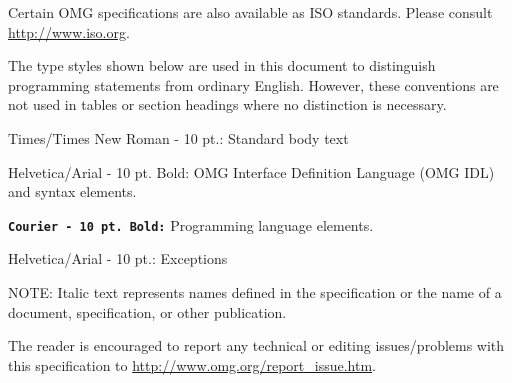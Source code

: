 \documentclass[10pt, a4paper, wd]{isov2}
\begin{document}
\noindent Certain OMG specifications are also available as ISO standards. Please consult \url{http://www.iso.org}.



The type styles shown below are used in this document to distinguish
 programming statements from ordinary English. However, these conventions are
 not used in tables or section headings where no distinction is necessary.



\medskip \noindent
Times/Times New Roman - 10 pt.:  Standard body text


\medskip \noindent
{\selectfont
Helvetica/Arial - 10 pt. Bold: } OMG Interface Definition Language (OMG IDL)
and syntax elements.

\medskip \noindent
\texttt{\textbf {Courier - 10 pt. Bold:}}  Programming language elements.

\medskip \noindent
{\selectfont
Helvetica/Arial - 10 pt.: } Exceptions

\medskip\noindent
NOTE: Italic text represents names defined in the specification or the name of
 a document, specification, or other publication. 




The reader is encouraged to report any technical or editing issues/problems
 with this specification to \url{http://www.omg.org/report_issue.htm}.


\end{document}
